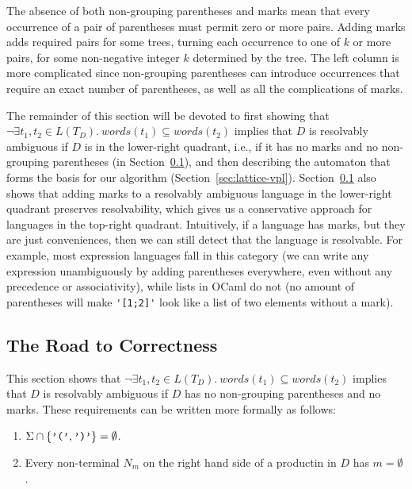 \documentclass[runningheads]{llncs}
\newcommand{\T}{\Sigma} %
\newcommand{\words}{\mathit{words}} %
\begin{document}
\noindent The absence of both non-grouping parentheses and marks mean that every occurrence of a pair of parentheses must permit zero or more pairs. Adding marks adds required pairs for some trees, turning each occurrence to one of $k$ or more pairs, for some non-negative integer $k$ determined by the tree. The left column is more complicated since non-grouping parentheses can introduce occurrences that require an exact number of parentheses, as well as all the complications of marks.

The remainder of this section will be devoted to first showing that $\neg \exists t_1, t_2 \in L(T_D).\ \words(t_1) \subseteq \words(t_2)$ implies that $D$ is resolvably ambiguous if $D$ is in the lower-right quadrant, i.e., if it has no marks and no non-grouping parentheses (in Section~\ref{sec:static-proofs}), and then describing the automaton that forms the basis for our algorithm (Section~\ref{sec:lattice-vpl}). Section~\ref{sec:static-proofs} also shows that adding marks to a resolvably ambiguous language in the lower-right quadrant preserves resolvability, which gives us a conservative approach for languages in the top-right quadrant. Intuitively, if a language has marks, but they are just conveniences, then we can still detect that the language is resolvable. For example, most expression languages fall in this category (we can write any expression unambiguously by adding parentheses everywhere, even without any precedence or associativity), while lists in OCaml do not (no amount of parentheses will make \verb|'[1;2]'| look like a list of two elements without a mark).

\subsection{The Road to Correctness} \label{sec:static-proofs} %

This section shows that $\neg \exists t_1, t_2 \in L(T_D).\ \words(t_1) \subseteq \words(t_2)$ implies that $D$ is resolvably ambiguous if $D$ has no non-grouping parentheses and no marks. These requirements can be written more formally as follows:

\begin{enumerate}
  \item $\T \cap \{\verb|'('|, \verb|')'|\} = \emptyset$.
  \item Every non-terminal $N_m$ on the right hand side of a productin in $D$ has $m = \emptyset$.
\end{enumerate}
\end{document}
